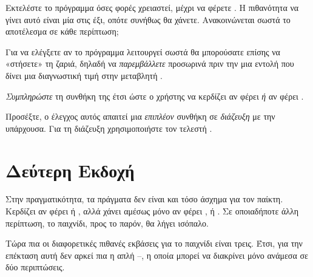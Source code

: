 \documentclass[a4paper,11pt,oneside]{book}
\begin{document}
\begin{step}
Εκτελέστε το πρόγραμμα όσες φορές χρειαστεί, μέχρι να φέρετε . Η πιθανότητα να γίνει αυτό είναι μία στις έξι, οπότε συνήθως θα χάνετε. Ανακοινώνεται σωστά το αποτέλεσμα σε κάθε περίπτωση;

\marginnote[14pt]{\icondiscuss}
\dottedline

\begin{note}
Για να ελέγξετε αν το πρόγραμμα λειτουργεί σωστά θα μπορούσατε επίσης να «στήσετε» τη ζαριά, δηλαδή να \emph{παρεμβάλλετε} προσωρινά πριν την  μια εντολή που δίνει μια διαγνωστική τιμή στην μεταβλητή .
\end{note}
\end{step}

\begin{step}
\emph{Συμπληρώστε} τη συνθήκη της  έτσι ώστε ο χρήστης να κερδίζει αν φέρει  \emph{ή} αν φέρει .

\marginnote[16pt]{\iconcaution}
Προσέξτε, ο έλεγχος αυτός απαιτεί μια \emph{επιπλέον} συνθήκη σε \emph{διάζευξη} με την υπάρχουσα. Για τη διάζευξη χρησιμοποιήστε τον τελεστή .


\end{step}

\section{Δεύτερη Εκδοχή}

Στην πραγματικότητα, τα πράγματα δεν είναι και τόσο άσχημα για τον παίκτη. Κερδίζει αν φέρει  ή , αλλά χάνει αμέσως μόνο αν φέρει ,  ή . Σε οποιαδήποτε άλλη περίπτωση, το παιχνίδι, προς το παρόν, θα λήγει ισόπαλο.

Τώρα πια οι διαφορετικές πιθανές εκβάσεις για το παιχνίδι είναι τρεις. Έτσι, για την επέκταση αυτή δεν αρκεί πια η απλή --, η οποία μπορεί να διακρίνει μόνο ανάμεσα σε δύο περιπτώσεις.
\end{document}
